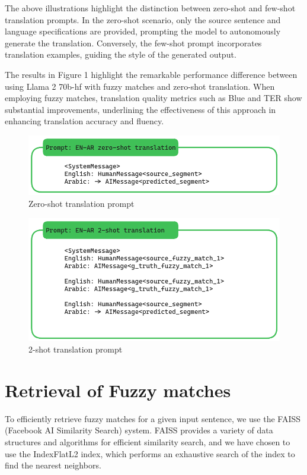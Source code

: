 \documentclass{article}
\begin{document}
The above illustrations highlight the distinction between zero-shot and few-shot translation prompts. In the zero-shot scenario, only the source sentence and language specifications are provided, prompting the model to autonomously generate the translation. Conversely, the few-shot prompt incorporates translation examples, guiding the style of the generated output.

The results in Figure 1 highlight the remarkable performance difference between using Llama 2 70b-hf with fuzzy matches and zero-shot translation. When employing fuzzy matches, translation quality metrics such as Blue and TER show substantial improvements, underlining the effectiveness of this approach in enhancing translation accuracy and fluency.

\begin{figure}
	\centering
	\includegraphics[width=\linewidth, ]{figs/prompt_zero_shot_translation} %
	\caption{ Zero-shot translation prompt}
	
	\label{fig:duck_863}
\end{figure}

\begin{figure}
	\centering
	\includegraphics[width=\linewidth, ]{figs/prompt_two_shot_translation} %
	\caption{ 2-shot translation prompt}
	
	\label{fig:duck_55}
\end{figure}


\section{Retrieval of Fuzzy matches}
To efficiently retrieve fuzzy matches for a given input sentence, we use the FAISS (Facebook AI Similarity Search) system. FAISS provides a variety of data structures and algorithms for efficient similarity search, and we have chosen to use the IndexFlatL2 index, which performs an exhaustive search of the index to find the nearest neighbors.
\end{document}
